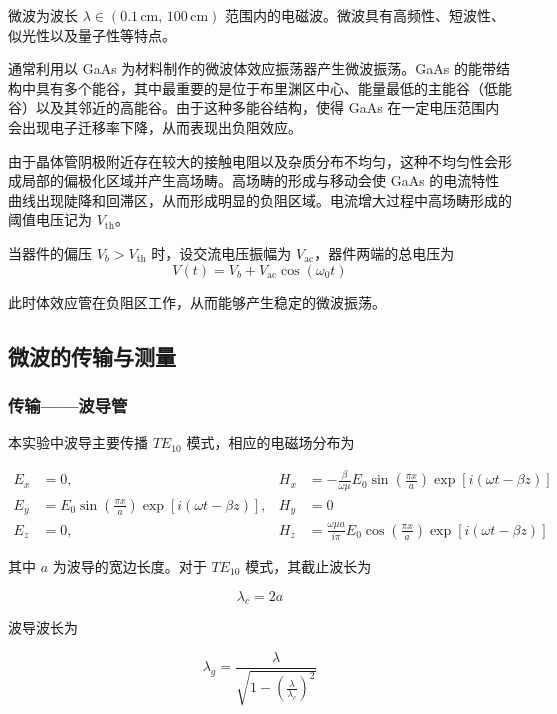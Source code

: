 \documentclass[a4paper, 1.5lines]{ctexart}
\begin{document}
微波为波长 $\lambda \in (0.1\,\text{cm},\,100\,\text{cm})$ 范围内的电磁波。微波具有高频性、短波性、似光性以及量子性等特点。

通常利用以 GaAs 为材料制作的微波体效应振荡器产生微波振荡。GaAs 的能带结构中具有多个能谷，其中最重要的是位于布里渊区中心、能量最低的主能谷（低能谷）以及其邻近的高能谷。由于这种多能谷结构，使得 GaAs 在一定电压范围内会出现电子迁移率下降，从而表现出负阻效应。

由于晶体管阴极附近存在较大的接触电阻以及杂质分布不均匀，这种不均匀性会形成局部的偏极化区域并产生高场畴。高场畴的形成与移动会使 GaAs 的电流特性曲线出现陡降和回滞区，从而形成明显的负阻区域。电流增大过程中高场畴形成的阈值电压记为 $V_{\text{th}}$。

当器件的偏压 $V_b > V_{\text{th}}$ 时，设交流电压振幅为 $V_{\text{ac}}$，器件两端的总电压为
\begin{equation}
V(t) = V_b + V_{\text{ac}}\cos(\omega_0 t)
\end{equation}

此时体效应管在负阻区工作，从而能够产生稳定的微波振荡。

\subsection{微波的传输与测量}

\subsubsection{传输——波导管}

本实验中波导主要传播 $TE_{10}$ 模式，相应的电磁场分布为

\begin{align}
E_x &= 0, &
H_x &= -\frac{\beta}{\omega\mu}E_0 \sin\left(\frac{\pi x}{a}\right)\exp[i(\omega t-\beta z)] \\
E_y &= E_0 \sin\left(\frac{\pi x}{a}\right)\exp[i(\omega t-\beta z)], &
H_y &= 0 \\
E_z &= 0, &
H_z &= \frac{\omega\mu a}{i\pi}E_0 \cos\left(\frac{\pi x}{a}\right)\exp[i(\omega t-\beta z)]
\end{align}

其中 $a$ 为波导的宽边长度。对于 $TE_{10}$ 模式，其截止波长为

\begin{equation}
\lambda_c = 2a
\end{equation}

波导波长为

\begin{equation}
\lambda_g = \frac{\lambda}{\sqrt{1-\left(\frac{\lambda}{\lambda_c}\right)^2}}
\end{equation}
\end{document}
